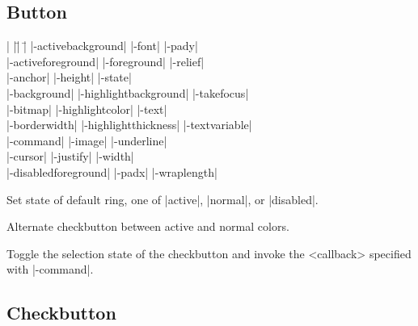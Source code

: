 \subsection*{Button}
\vspace{-4pt}
\begin{tabbing}
|                   |\=|                     |\= \kill
|-activebackground| \> |-font|               \> |-pady| \\
|-activeforeground| \> |-foreground|         \> |-relief| \\
|-anchor|           \> |-height|             \> |-state| \\
|-background|       \> |-highlightbackground|\> |-takefocus| \\
|-bitmap|           \> |-highlightcolor|     \> |-text| \\        
|-borderwidth|      \> |-highlightthickness| \> |-textvariable| \\
|-command|          \> |-image|              \> |-underline| \\   
|-cursor|	    \> |-justify|            \> |-width| \\       
|-disabledforeground| \> |-padx| 	     \> |-wraplength| \\  
\end{tabbing}

\vskip5pt
\begin{enum}{1cm}

Set state of default ring, one of |active|, |normal|, or |disabled|.

\end{enum}

\vskip5pt
\begin{enum}{1cm}

Alternate checkbutton between active and normal  colors.

Toggle the selection state of the checkbutton and invoke the 
<callback> specified with |-command|.

\end{enum}

\subsection*{Checkbutton}
\vspace{-4pt}

